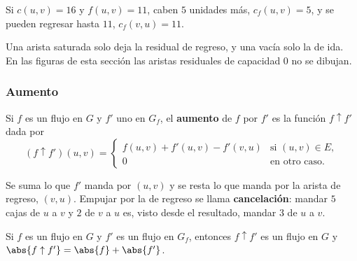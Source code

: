 \documentclass[11pt,letterpaper]{article}
\begin{document}
\begin{ejemplo}\label{ej:flujo-arista}
  Si $c(u, v) = 16$ y $f(u, v) = 11$, caben $5$ unidades más,
  $c_f(u, v) = 5$, y se pueden regresar hasta $11$, $c_f(v, u) = 11$.
  \begin{center}
  \hspace{1.5cm}
  \end{center}
  Una arista saturada solo deja la residual de regreso, y una vacía
  solo la de ida. En las figuras de esta sección las aristas
  residuales de capacidad $0$ no se dibujan.
\end{ejemplo}

\subsubsection*{Aumento}

\begin{definicion}[Aumento]
  Si $f$ es un flujo en $G$ y $f'$ uno en $G_f$, el \textbf{aumento}
  de $f$ por $f'$ es la función $f \uparrow f'$ dada por
  \[
    (f \uparrow f')(u, v) =
    \begin{cases}
      f(u, v) + f'(u, v) - f'(v, u) & \text{si } (u, v) \in E , \\
      0 & \text{en otro caso.}
    \end{cases}
  \]
\end{definicion}

Se suma lo que $f'$ manda por $(u, v)$ y se resta lo que manda por la
arista de regreso, $(v, u)$. Empujar por la de regreso se llama
\textbf{cancelación}: mandar $5$ cajas de $u$ a $v$ y $2$ de $v$ a $u$
es, visto desde el resultado, mandar $3$ de $u$ a $v$.

\begin{lema}\label{lem:flujo-aumento}
  Si $f$ es un flujo en $G$ y $f'$ es un flujo en $G_f$, entonces
  $f \uparrow f'$ es un flujo en $G$ y
  $\abs{f \uparrow f'} = \abs{f} + \abs{f'}$.
\end{lema}
\end{document}
